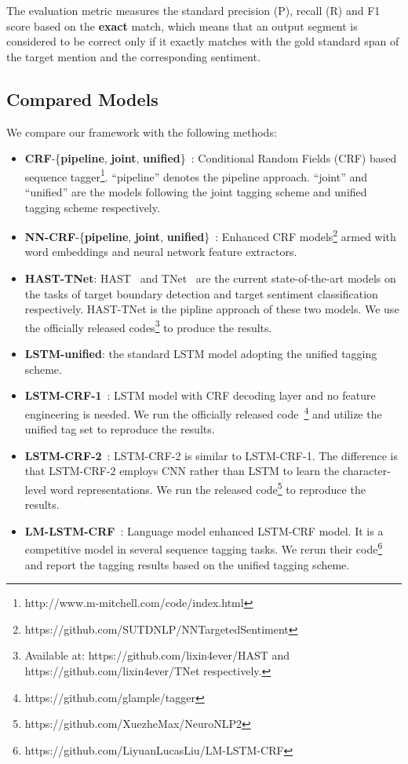 \documentclass[letterpaper]{article} \usepackage{aaai19}  \usepackage{times}  \usepackage{helvet}  \usepackage{courier}  \usepackage{url}  \usepackage{graphicx}  \frenchspacing  \setlength{\pdfpagewidth}{8.5in}  \setlength{\pdfpageheight}{11in}
\begin{document}
The evaluation metric measures the standard precision (P), recall (R) and F1 score based on the \textbf{exact} match, which means that an output segment is considered to be correct only if it exactly matches with the gold standard span of the target mention and the corresponding sentiment. 

\subsection{Compared Models}
We compare our framework with the following methods:
\begin{itemize}
    \item \textbf{CRF}-\{\textbf{pipeline}, \textbf{joint}, \textbf{unified}\}~\cite{D13-1171}: Conditional Random Fields (CRF) based sequence tagger\footnote{http://www.m-mitchell.com/code/index.html}. ``pipeline'' denotes the pipeline approach. ``joint'' and ``unified'' are the models following the joint tagging scheme and unified tagging scheme respectively.
    \item \textbf{NN-CRF}-\{\textbf{pipeline}, \textbf{joint}, \textbf{unified}\}~\cite{D15-1073}: Enhanced CRF models\footnote{https://github.com/SUTDNLP/NNTargetedSentiment} armed with word embeddings and neural network feature extractors.
    \item \textbf{HAST-TNet}: HAST~\cite{li2018aspect} and TNet~\cite{P18-1087} are the current state-of-the-art models on the tasks of target boundary detection and target sentiment classification respectively. HAST-TNet is the pipline approach of these two models. We use the officially released codes\footnote{Available at: https://github.com/lixin4ever/HAST and  https://github.com/lixin4ever/TNet respectively.} to produce the results.
    \item \textbf{LSTM-unified}: the standard LSTM model adopting the unified tagging scheme.
    \item \textbf{LSTM-CRF-1}~\cite{N16-1030}: LSTM model with CRF decoding layer and no feature engineering is needed. We run the officially released code~\footnote{https://github.com/glample/tagger} and utilize the unified tag set to reproduce the results. 
    \item \textbf{LSTM-CRF-2}~\cite{P16-1101}: LSTM-CRF-2 is similar to LSTM-CRF-1. The difference is that LSTM-CRF-2 employs CNN rather than LSTM to learn the character-level word representations. We run the released code\footnote{https://github.com/XuezheMax/NeuroNLP2} to reproduce the results.
    \item \textbf{LM-LSTM-CRF}~\cite{liu2017empower}: Language model enhanced LSTM-CRF model. It is a competitive model in several sequence tagging tasks. We rerun their code\footnote{https://github.com/LiyuanLucasLiu/LM-LSTM-CRF} and report the tagging results based on the unified tagging scheme.
\end{itemize}
\end{document}
